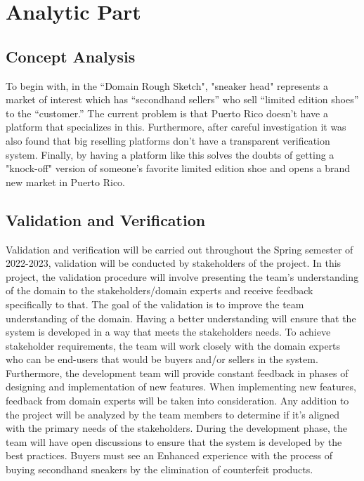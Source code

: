 \chapter{Analytic Part}
\newpage
\section{Concept Analysis}
\hspace{1cm} To begin with, in the “Domain Rough Sketch", 
"sneaker head" represents a market of interest which has “secondhand sellers” who sell “limited edition shoes” to the “customer.” 
The current problem is that Puerto Rico doesn't have a platform that specializes in this. Furthermore, after careful investigation it was also found that big reselling platforms don't have a transparent verification system. Finally, by having a platform like this solves the doubts of getting a "knock-off" version of someone's favorite limited edition shoe and opens a brand new market in Puerto Rico.
\section{Validation and Verification}
\hspace{1cm} Validation and verification will be carried out throughout the Spring semester of 2022-2023, validation will be conducted by stakeholders of the project. In this project, the validation procedure will involve presenting the team’s understanding of the domain to the stakeholders/domain experts and receive feedback specifically to that. The goal of the validation is to improve the team understanding of the domain. Having a better understanding will ensure that the system is developed in a way that meets the stakeholders needs. To achieve stakeholder requirements, the team will work closely with the domain experts who can be end-users that would be buyers and/or sellers in the system. Furthermore, the development team will provide constant feedback in phases of designing and implementation of new features. When implementing new features, feedback from domain experts will be taken into consideration. Any addition to the project will be analyzed by the team members to determine if it’s aligned with the primary needs of the stakeholders. During the development phase, the team will have open discussions to ensure that the system is developed by the best practices. Buyers must see an Enhanced experience with the process of buying secondhand sneakers by the elimination of counterfeit products.